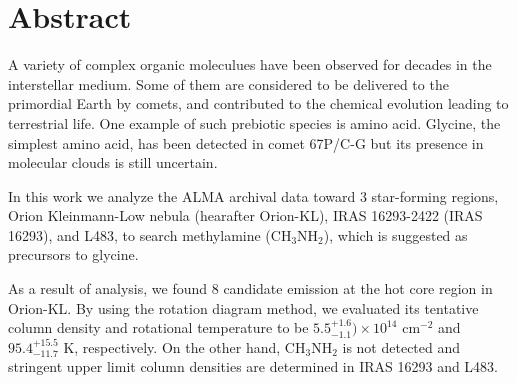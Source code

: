\chapter*{Abstract}

\singlespacing
\doublespacing

A variety of complex organic moleculues have been observed for decades in the interstellar medium.
Some of them are considered to be delivered to the primordial Earth by comets, 
and contributed to the chemical evolution leading to terrestrial life.
One example of such prebiotic species is amino acid. Glycine, the simplest amino acid, 
has been detected in comet 67P/C-G but its presence in molecular clouds is still uncertain.

In this work we analyze the ALMA archival data toward 3 star-forming regions, 
Orion Kleinmann-Low nebula (hearafter Orion-KL), IRAS 16293-2422 (IRAS 16293), and L483,
to search methylamine (CH$_3$NH$_2$), which is suggested as precursors to glycine. 

As a result of analysis, we found 8 candidate emission at the hot core region in Orion-KL.
By using the rotation diagram method, we evaluated its tentative column density 
and rotational temperature to be $5.5^{+1.6}_{-1.1} ) \times 10^{14}$ cm$^{-2}$ and $95.4^{+15.5}_{-11.7} \,\,\mathrm{K}$, respectively. 
On the other hand, CH$_3$NH$_2$ is not detected and stringent upper limit column densities
are determined in IRAS 16293 and L483.